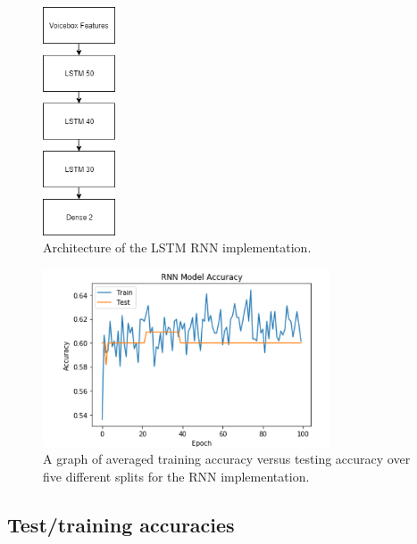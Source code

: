 \documentclass{article}
\begin{document}
\begin{figure}[htb]
	\centering
	\includegraphics[width = 2.15cm]{figs/rnn_architecture}
	\caption{Architecture of the LSTM RNN implementation.}
	\label{fig:rnn_architecture}
\end{figure}

\begin{figure}[htb]
	\centering
	\includegraphics[width = 8.5cm]{figs/rnn_graph}
	\caption{A graph of averaged training accuracy versus testing accuracy over five different splits for the RNN implementation.}
	\label{fig:rnn_graph}
\end{figure}

\subsection{Test/training accuracies}
\label{subsec:tables}
\end{document}
